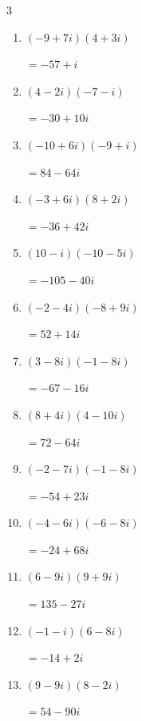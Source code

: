 \begin{multicols}{3}
\begin{enumerate}
        $\displaystyle =-76+3i$

  \item $\displaystyle (-9+7i)(4+3i)$

        $\displaystyle =-57+i$

  \item $\displaystyle (4-2i)(-7-i)$

        $\displaystyle =-30+10i$

\columnbreak %

  \item $\displaystyle (-10+6i)(-9+i)$

        $\displaystyle =84-64i$

  \item $\displaystyle (-3+6i)(8+2i)$

        $\displaystyle =-36+42i$

  \item $\displaystyle (10-i)(-10-5i)$

        $\displaystyle =-105-40i$

  \item $\displaystyle (-2-4i)(-8+9i)$

        $\displaystyle =52+14i$

  \item $\displaystyle (3-8i)(-1-8i)$

        $\displaystyle =-67-16i$

  \item $\displaystyle (8+4i)(4-10i)$

        $\displaystyle =72-64i$

  \item $\displaystyle (-2-7i)(-1-8i)$

        $\displaystyle =-54+23i$

  \item $\displaystyle (-4-6i)(-6-8i)$

        $\displaystyle =-24+68i$

  \item $\displaystyle (6-9i)(9+9i)$

        $\displaystyle =135-27i$

  \item $\displaystyle (-1-i)(6-8i)$

        $\displaystyle =-14+2i$

  \item $\displaystyle (9-9i)(8-2i)$

        $\displaystyle =54-90i$


\end{enumerate}
\end{multicols}

